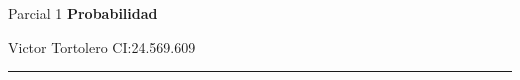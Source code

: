 \documentclass{article}
\begin{document}
\flushleft
\setlength{\parindent}{20pt}

\justify
\centerline{\huge Parcial 1 \textbf{Probabilidad}}
\centerline{Victor Tortolero CI:24.569.609}  %
\vspace{0.1cm}
\hrule



 \newpage

 \newpage

 \newpage

 \newpage
\end{document}
